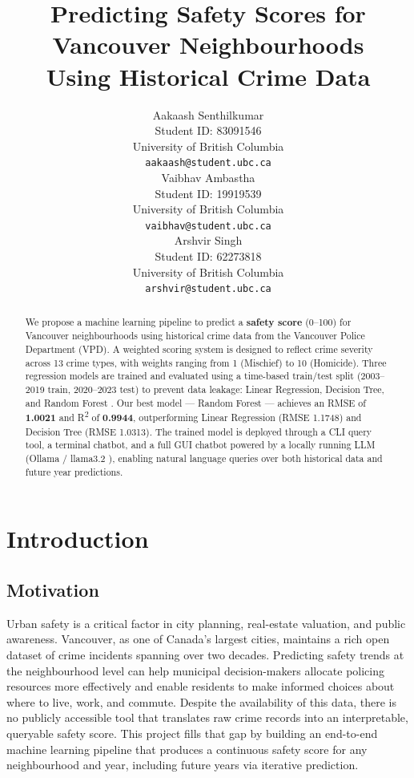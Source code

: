 \documentclass{article}
\title{Predicting Safety Scores for Vancouver Neighbourhoods\\
Using Historical Crime Data}
\author{
  Aakaash Senthilkumar \\
  Student ID: 83091546 \\
  University of British Columbia \\
  \texttt{aakaash@student.ubc.ca} \\
  \And
  Vaibhav Ambastha \\
  Student ID: 19919539 \\
  University of British Columbia \\
  \texttt{vaibhav@student.ubc.ca} \\
  \And
  Arshvir Singh \\
  Student ID: 62273818 \\
  University of British Columbia \\
  \texttt{arshvir@student.ubc.ca} \\
}
\begin{document}
\maketitle

\begin{abstract}
We propose a machine learning pipeline to predict a \textbf{safety score} (0--100)
for Vancouver neighbourhoods using historical crime data from the Vancouver Police
Department (VPD). A weighted scoring system is designed to reflect crime severity
across 13 crime types, with weights ranging from 1 (Mischief) to 10 (Homicide).
Three regression models are trained and evaluated using a time-based train/test
split (2003--2019 train, 2020--2023 test) to prevent data leakage: Linear
Regression, Decision Tree, and Random Forest \cite{breiman2001random,
quinlan1986induction}. Our best model --- Random Forest --- achieves an RMSE of
\textbf{1.0021} and R\textsuperscript{2} of \textbf{0.9944}, outperforming Linear
Regression (RMSE 1.1748) and Decision Tree (RMSE 1.0313). The trained model is
deployed through a CLI query tool, a terminal chatbot, and a full GUI chatbot
powered by a locally running LLM (Ollama / llama3.2 \cite{ollama2024}), enabling
natural language queries over both historical data and future year predictions.
\end{abstract}

\section{Introduction}

\subsection{Motivation}
Urban safety is a critical factor in city planning, real-estate valuation, and
public awareness. Vancouver, as one of Canada's largest cities, maintains a rich
open dataset of crime incidents spanning over two decades. Predicting safety trends
at the neighbourhood level can help municipal decision-makers allocate policing
resources more effectively and enable residents to make informed choices about where
to live, work, and commute. Despite the availability of this data, there is no
publicly accessible tool that translates raw crime records into an interpretable,
queryable safety score. This project fills that gap by building an end-to-end
machine learning pipeline that produces a continuous safety score for any
neighbourhood and year, including future years via iterative prediction.
\end{document}
